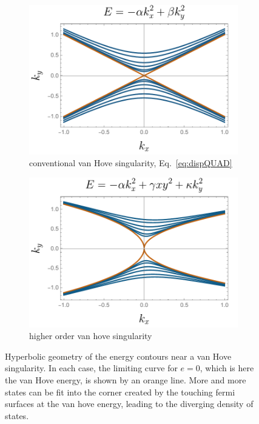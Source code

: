 \begin{figure}[h]
    \centering
    \begin{subfigure}[t]{0.45\linewidth}
        \centering
        \includegraphics[width=\textwidth]{figures/introduction/logcontours.pdf}
        \caption{\centering conventional van Hove singularity, Eq.~\eqref{eq:dispQUAD}}
        \label{fig:logcontours}
    \end{subfigure}
    \hfill
    \begin{subfigure}[t]{0.45\linewidth}
        \centering
        \includegraphics[width=\textwidth]{figures/introduction/paracontours.pdf}
        \caption{\centering higher order van hove singularity}
        \label{fig:paracontours}
    \end{subfigure}
    \hfill
    \caption{Hyperbolic geometry of the energy contours near a van Hove singularity. In each case, the limiting curve for $e=0$, which is here the van Hove energy, is shown by an orange line. More and more states can be fit into the corner created by the touching fermi surfaces at the van hove energy, leading to the diverging density of states.}
    \label{fig:vanHoveillustration}
\end{figure}

